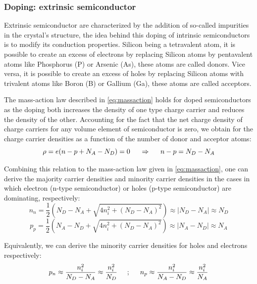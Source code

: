 		\subsubsection{Doping: extrinsic semiconductor}

		Extrinsic semiconductor are characterized by the addition of so-called impurities in the crystal's structure, the idea behind this doping of intrinsic semiconductors is to modify its conduction properties. Silicon being a tetravalent atom, it is possible to create an excess of electrons by replacing Silicon atoms by pentavalent atoms like Phosphorus (P) or Arsenic (As), these atoms are called donors.  Vice versa, it is possible to create an excess of holes by replacing Silicon atoms with trivalent atoms like Boron (B) or Gallium (Ga), these atoms are called acceptors.
		
		The mass-action law described in \eqref{eq:massaction} holds for doped semiconductors as the doping both increases the density of one type charge carrier and reduces the density of the other. Accounting for the fact that the net charge density of charge carriers for any volume element of semiconductor is zero, we obtain for the charge carrier densities as a function of the number of donor and acceptor atoms: 
		\begin{equation}
			\rho = e(n - p + N_A - N_D) = 0 \hspace{5mm} \Rightarrow \hspace{5mm} n-p = N_D - N_A
		\end{equation}
		
		Combining this relation to the mass-action law given in \eqref{eq:massaction}, one can derive the majority carrier densities and minority carrier densities in the cases in which electron (n-type semiconductor) or holes (p-type semiconductor) are dominating, respectively: 
		\begin{equation}
			n_n = \frac{1}{2} {\left( N_D - N_A + \sqrt{4 n_i^2 + (N_D - N_A)^2} \right)} \approx |N_D - N_A| \approx N_D
		\end{equation}
		\begin{equation}
			p_p = \frac{1}{2} {\left( N_A - N_D + \sqrt{4 n_i^2 + (N_D - N_A)^2} \right)} \approx |N_A - N_D| \approx N_A
		\end{equation}

		Equivalently, we can derive the minority carrier densities for holes and electrons respectively: 
		\begin{equation}
			p_n \approx \frac{n_i^2}{N_D - N_A} \approx \frac{n_i^2}{N_D} \hspace{5mm} ; \hspace{5mm} n_p \approx \frac{n_i^2}{N_A - N_D} \approx \frac{n_i^2}{N_A}
 		\end{equation}

